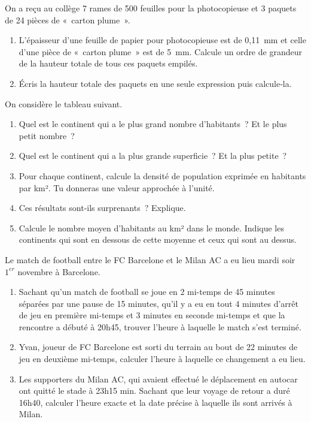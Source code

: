 \begin{exercice}
On a reçu au collège 7 rames de 500 feuilles pour la photocopieuse et 3 paquets de 24 pièces de « carton plume ».
\begin{enumerate}
 \item L'épaisseur d'une feuille de papier pour photocopieuse est de 0,11 mm et celle d'une pièce de « carton plume » est de 5 mm. Calcule un ordre de grandeur de la hauteur totale de tous ces paquets empilés.
 \item Écris la hauteur totale des paquets en une seule expression puis calcule‑la.
 \end{enumerate}
\end{exercice}


\begin{exercice}
On considère le tableau suivant.
\begin{enumerate}
 \item Quel est le continent qui a le plus grand nombre d'habitants ? Et le plus petit nombre ?
 \item Quel est le continent qui a la plus grande superficie ? Et la plus petite ?
 \item Pour chaque continent, calcule la densité de population exprimée en habitants par km². Tu donneras une valeur approchée à l'unité. 
 \item Ces résultats sont‑ils surprenants ? Explique.
 \item Calcule le nombre moyen d'habitants au km² dans le monde. Indique les continents qui sont en dessous de cette moyenne et ceux qui sont au dessus. %
 \end{enumerate}
\end{exercice}


\begin{exercice}[Football]
Le match de football entre le FC Barcelone et le Milan AC a eu lieu mardi soir $1^{er}$ novembre à Barcelone. 
\begin{enumerate}
 \item Sachant qu’un match de football se joue en 2 mi-temps de 45 minutes séparées par une pause de 15 minutes, qu’il y a eu en tout 4 minutes d’arrêt de jeu en première mi-temps et 3 minutes en seconde mi-temps et que la rencontre a débuté à 20h45, trouver l’heure à laquelle le match s’est terminé. 
 \item Yvan, joueur de FC Barcelone est sorti du terrain au bout de 22 minutes de jeu en deuxième mi-temps, calculer l’heure à laquelle ce changement a eu lieu.
 \item Les supporters du Milan AC, qui avaient effectué le déplacement en autocar ont quitté le stade à 23h15 min. Sachant que leur voyage de retour a duré 16h40, calculer l’heure exacte et la date précise à laquelle ils sont arrivés à Milan. 
 \end{enumerate}
\end{exercice}
